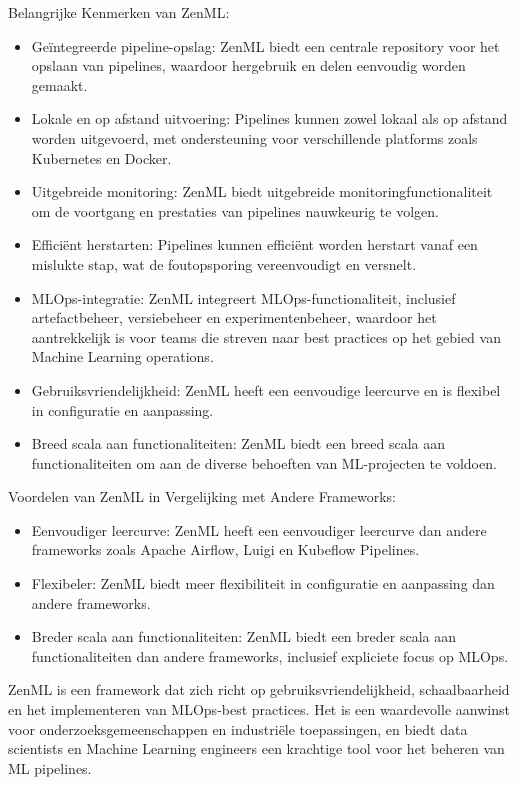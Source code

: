 Belangrijke Kenmerken van ZenML:
\begin{itemize}
    \item Geïntegreerde pipeline-opslag: ZenML biedt een centrale repository voor het opslaan van pipelines, waardoor hergebruik en delen eenvoudig worden gemaakt.
    \item Lokale en op afstand uitvoering: Pipelines kunnen zowel lokaal als op afstand worden uitgevoerd, met ondersteuning voor verschillende platforms zoals Kubernetes en Docker.
    \item Uitgebreide monitoring: ZenML biedt uitgebreide monitoringfunctionaliteit om de voortgang en prestaties van pipelines nauwkeurig te volgen.
    \item Efficiënt herstarten: Pipelines kunnen efficiënt worden herstart vanaf een mislukte stap, wat de foutopsporing vereenvoudigt en versnelt.
    \item MLOps-integratie: ZenML integreert MLOps-functionaliteit, inclusief artefactbeheer, versiebeheer en experimentenbeheer, waardoor het aantrekkelijk is voor teams die streven naar best practices op het gebied van Machine Learning operations.
    \item Gebruiksvriendelijkheid: ZenML heeft een eenvoudige leercurve en is flexibel in configuratie en aanpassing.
    \item Breed scala aan functionaliteiten: ZenML biedt een breed scala aan functionaliteiten om aan de diverse behoeften van ML-projecten te voldoen.
\end{itemize}

Voordelen van ZenML in Vergelijking met Andere Frameworks:
\begin{itemize}
    \item Eenvoudiger leercurve: ZenML heeft een eenvoudiger leercurve dan andere frameworks zoals Apache Airflow, Luigi en Kubeflow Pipelines.
    \item Flexibeler: ZenML biedt meer flexibiliteit in configuratie en aanpassing dan andere frameworks.
    \item Breder scala aan functionaliteiten: ZenML biedt een breder scala aan functionaliteiten dan andere frameworks, inclusief expliciete focus op MLOps.
\end{itemize}
ZenML is een framework dat zich richt op gebruiksvriendelijkheid, schaalbaarheid en het implementeren van MLOps-best practices. Het is een waardevolle aanwinst voor onderzoeksgemeenschappen en industriële toepassingen, en biedt data scientists en Machine Learning engineers een krachtige tool voor het beheren van ML pipelines.

